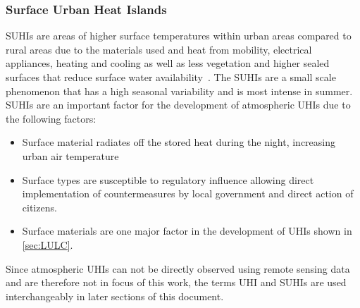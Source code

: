 \documentclass[12pt,a4paper, english,twoside]{scrartcl}
\begin{document}
    \subsubsection{Surface Urban Heat Islands}\label{sec:suhi}
       \glspl{SUHI} are areas of higher surface temperatures within urban areas compared to rural areas due to the materials used and heat from mobility, electrical appliances, heating and cooling as well as less vegetation and higher sealed surfaces that reduce surface water availability~\autocite[pp. 7--12]{EPA2008}. 
       The \glspl{SUHI} are a small scale phenomenon that has a high seasonal variability and is most intense in summer.
       \glspl{SUHI} are an important factor for the development of atmospheric \glspl{UHI} due to the following factors:
       \begin{itemize}
         \item Surface material radiates off the stored heat during the night, increasing urban air temperature
         \item Surface types are susceptible to regulatory influence allowing direct implementation of countermeasures by local government and direct action of citizens.
         \item Surface materials are one major factor in the development of \glspl{UHI} shown in \cref{sec:LULC}.
       \end{itemize}
       Since atmospheric \glspl{UHI} can not be directly observed using remote sensing data and are therefore not in focus of this work, the terms \gls{UHI} and \glspl{SUHI} are used interchangeably in later sections of this document. 
    \newpage
\end{document}
